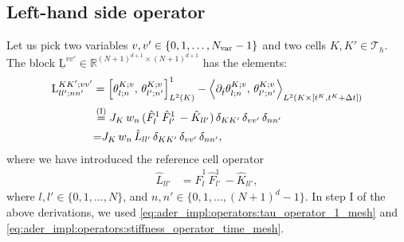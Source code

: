 \documentclass{scrreprt}
\theoremstyle{definition}
\theoremstyle{nonumberplain}
\newcommand{\laMat}[1]{\underline{\mathrm{#1}}}
\newcommand{\laMatel}[1]{\mathrm{#1}}
\newcommand{\tria}{\mathcal{T}_h}
\newcommand{\cell}{K}
\newcommand{\detJ}{J_\cell}
\begin{document}
\subsection{Left-hand side operator}
Let us pick two variables $v,v'\in\{0,1,\ldots,N_\textup{var}-1\}$
and two cells $\cell,\cell'\in\tria$.
The block
$\laMat{L}^{vv'}\in\mathbb{R}^{(N+1)^{d+1}\times(N+1)^{d+1}}$ has the elements:
\begin{align}
\laMatel{L}^{\cell\cell';vv'}_{ll';nn'}
&=
\left[\theta^{\cell;v}_{l;n},\,\theta^{\cell;v}_{l';n'}\right]^{1}_{L^2(\cell)}
-
\left\langle
\partial_{\hat{t}}\theta^{\cell;v}_{l;n},\,
\theta^{\cell;v}_{l';n'}
\right\rangle
_{L^2(\cell\times[t^\cell,t^\cell+\Delta t])}
\notag
\\
&
\overset{\textup{(I)}}
{=}
\detJ\,
w_{n}\,
(\hat{F}^1_{l}\,
\hat{F}^1_{l'}\,
-\hat{K}_{ll'})\,
\delta_{\cell\cell'}\,\delta_{vv'}\,
\delta_{n n'}
\notag
\\
&{=}
\detJ\,
w_{n}\,
\hat{L}_{ll'}\,
\delta_{\cell\cell'}\,\delta_{vv'}\,
\delta_{n n'},
\end{align}
where we have introduced the reference cell operator
\begin{align}
\hat{L}_{ll'}
&=
\hat{F}^1_{l}\,
\hat{F}^1_{l'}\,
-\hat{K}_{ll'},
\end{align}
where $l,l'\in\{0,1,\ldots,N\}$, and
$n,n'\in\{0,1,\ldots,(N+1)^{d}-1\}$.
In step I of the above derivations, we
used
\eqref{eq:ader_impl:operators:tau_operator_1_mesh}
and
\eqref{eq:ader_impl:operators:stiffness_operator_time_mesh}.
\end{document}

